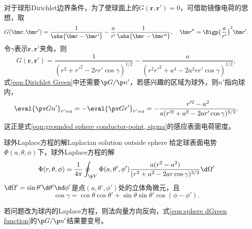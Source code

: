 对于球形Dirichlet边界条件，为了使球面上的$G(\bm r,\bm r')=0$，可借助镜像电荷的思想，取
\begin{equation}
    \label{eqn:sphere Green function}
    G(\bm r,\bm r')=\frac1{\abs{\bm r-\bm r'}}-\frac a{r'}\frac1{\abs{\bm r-\bm r''}},\quad\bm r''=\Bigp{\frac{a}{r'}}^2\bm r'.
\end{equation}
令$\gamma$表示$\bm r,\bm r'$夹角，则
\[
    G(\bm r,\bm r')=\frac1{(r^2+r'^2-2rr'\cos\gamma)^{1/2}}-\frac a{(r^2r'^2+a^4-2a^2rr'\cos\gamma)^{1/2}},
\]
式\eqref{eqn:Dirichlet Green}中还需要$\p G/\p n'$，若感兴趣的区域为球外，则$n'$指向球内，
\begin{equation}
    \label{eqn:sphere dGreen function}
    \eval{\pv G{n'}}_{r'=a}=-\eval{\pv G{r'}}_{r'=a}=-\frac{r'^2-a^2}{a(r'^2+a^2-2ar'\cos\gamma)^{3/2}}.
\end{equation}
这正是式\eqref{eqn:grounded sphere conductor-point, sigma}的感应表面电荷密度。

\begin{theorem}
    {球外Laplace方程的解}{Laplacian solution outside sphere}
    给定球表面电势$\Phi(a,\theta,\phi)$下，球外Laplace方程的解
    \begin{equation}
        \label{eqn:sphere Laplace solution}
        \Phi(r,\theta,\phi)=\frac1{4\pi}\oint_{\p V}\Phi(a,\theta',\phi')\frac{a(r^2-a^2)}{(r^2+a^2-2ar\cos\gamma)^{3/2}}\d\Omega'
    \end{equation}
    $\d\Omega'=\sin\theta'\d\theta'\nd\phi'$是点$(a,\theta',\phi')$处的立体角微元，且
    \[
        \cos\gamma=\cos\theta\cos\theta'+\sin\theta\sin\theta'\cos(\phi-\phi').
    \]
\end{theorem}
\begin{remark}
    若问题改为球内的Laplace方程，则法向量方向反向，式\eqref{eqn:sphere dGreen function}的$\p G/\p n'$结果要变号。
\end{remark}

